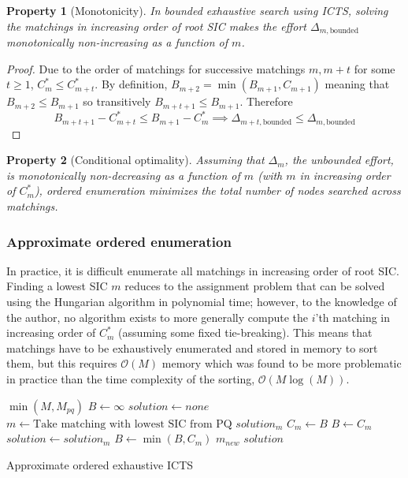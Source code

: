 \documentclass[english]{article}
\newtheorem{property}{Property}
\begin{document}
	\begin{property}[Monotonicity]
		\label{monotonicity}
		In bounded exhaustive search using ICTS, solving the matchings in increasing order of root SIC makes the effort $\Delta_{m,\text{bounded}}$ monotonically non-increasing as a function of $m$.
	\end{property}
	\begin{proof}
		Due to the order of matchings for successive matchings $m,m+t$ for some $t\geq 1$, $C^*_{m} \leq C^*_{m+t}$. By definition, $B_{m+2} = \min(B_{m+1},C_{m+1})$ meaning that $B_{m+2} \leq B_{m + 1}$ so transitively $B_{m+t+1} \leq B_{m+1}$. Therefore
		\[B_{m+t+1} - C^*_{m+t}\leq B_{m+1} - C^*_m\implies \Delta_{m+t,\text{bounded}} \leq \Delta_{m,\text{bounded}}\]
	\end{proof}
	\begin{property}[Conditional optimality]
		\label{cond-monoton-optim}
		Assuming that $\Delta_m$, the unbounded effort, is monotonically non-decreasing as a function of $m$ (with $m$ in increasing order of $C^*_m$), ordered enumeration minimizes the total number of nodes searched across matchings.
	\end{property}
	\subsubsection{Approximate ordered enumeration}
	In practice, it is difficult enumerate all matchings in increasing order of root SIC. Finding a lowest SIC $m$ reduces to the assignment problem that can be solved using the Hungarian algorithm \cite{kuhn55} in polynomial time; however, to the knowledge of the author, no algorithm exists to more generally compute the $i$'th matching in increasing order of $C^*_m$ (assuming some fixed tie-breaking). This means that matchings have to be exhaustively enumerated and stored in memory to sort them, but this requires $\mathcal{O}(M)$ memory which was found to be more problematic in practice than the time complexity of the sorting, $\mathcal{O}(M\log(M))$.
	
	\begin{algorithm}
		\begin{algorithmic}[1]
			\State {}$\min(M,M_{pq})$
			\State $B \gets \infty$
			\State $solution \gets none$
			\Repeat
			\State $m\gets\text{Take matching with lowest SIC from PQ}$
			\State $solution_m$  $C_m\gets$$B$ 
			\State $B\gets C_m$
			\State $solution \gets solution_m$
			\EndIf
			\State $B\gets\min(B,C_m)$
			\State {}$m_{new}$
			\EndIf
			\Return $solution$
		\end{algorithmic}
		\caption{Approximate ordered exhaustive ICTS} 
		\label{pq-algo}
	\end{algorithm}
	
\end{document}
